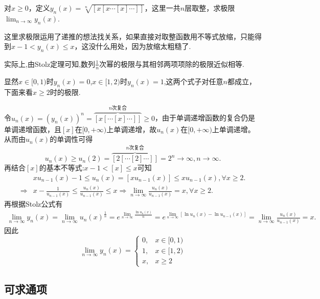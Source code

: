 \documentclass[../../main.tex]{subfiles}
\begin{document}
\begin{example}
对\(x\geqslant 0\)，定义\(y_n(x)=\sqrt[n]{[x[x\cdots[x]\cdots]]}\)，这里一共\(n\)层取整，求极限\(\lim_{n\rightarrow\infty}y_n(x)\).
\end{example}
\begin{note}
这里求极限运用了递推的想法找关系，如果直接对取整函数用不等式放缩，只能得到\(x - 1<y_n(x)\leqslant  x\)，这没什么用处，因为放缩太粗糙了.

实际上,由Stolz定理可知,数列$\frac{1}{n}$次幂的极限与其相邻两项项除的极限近似相等.
\end{note}
\begin{solution}
显然\(x\in[0,1)\)时\(y_n(x)=0\),\(x\in[1,2)\)时\(y_n(x)=1\),这两个式子对任意\(n\)都成立，下面来看\(x\geqslant 2\)时的极限.

令\(u_n(x) = (y_n(x))^n=\overbrace{[x[\cdots [x]\cdots ]]}^{n\text{次复合}}\geqslant 0\)，由于单调递增函数的复合仍是单调递增函数，且\([x]\)在\([0, +\infty)\)上单调递增，故\(u_n(x)\)在\([0, +\infty)\)上单调递增。
从而由\(u_n(x)\)的单调性可得
\[
u_n(x) \geqslant u_n(2)=\overbrace{[2[\cdots [2]\cdots ]]}^{n\text{次复合}} = 2^n\rightarrow \infty, n\rightarrow \infty.
\]
再结合\([x]\)的基本不等式:$x-1<\left[ x \right] \leqslant x$可知
\begin{align*}
&xu_{n-1}(x)-1\le u_n(x)=[xu_{n-1}(x)]\le xu_{n-1}(x),\forall x\ge 2.
\\
\Rightarrow &x-\frac{1}{u_{n-1}(x)}\le \frac{u_n(x)}{u_{n-1}(x)}\le x\Rightarrow \lim_{n\rightarrow \infty} \frac{u_n(x)}{u_{n-1}(x)}=x,\forall x\ge 2.
\end{align*}
再根据Stolz公式有
\begin{align*}
\lim_{n\rightarrow \infty} y_n(x)=\lim_{n\rightarrow \infty} u_n(x)^{\frac{1}{n}}=e^{\lim\limits_{n\rightarrow \infty} \frac{\ln u_n(x)}{n}}=e^{\lim\limits_{n\rightarrow \infty} [\ln u_n(x)-\ln u_{n-1}(x)]}=\lim_{n\rightarrow \infty} \frac{u_n(x)}{u_{n-1}(x)}=x.
\end{align*}
因此
\[ 
\lim_{n\rightarrow\infty}y_n(x)=
\begin{cases}
0, & x\in[0,1)\\
1, & x\in[1,2)\\
x, & x\geqslant 2
\end{cases}
\]

\end{solution}


\subsection{可求通项}
\end{document}
